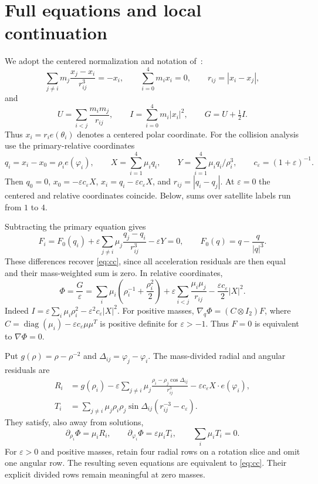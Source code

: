 \documentclass[11pt,a4paper]{article}
\numberwithin{equation}{section}
\theoremstyle{remark}
\newcommand{\eps}{\varepsilon}
\newcommand{\diag}{\operatorname{diag}}
\begin{document}
\section{Full equations and local continuation}\label{sec:variation}

We adopt the centered normalization and notation of~\cite[Section~2]{CCLM}:
\begin{equation}\label{eq:cc}
 \sum_{j\ne i}m_j\frac{x_j-x_i}{r_{ij}^3}=-x_i,\qquad
 \sum_{i=0}^4m_ix_i=0,\qquad r_{ij}=|x_i-x_j|,
\end{equation}
and
\begin{equation}\label{eq:UI}
 U=\sum_{i<j}\frac{m_im_j}{r_{ij}},\qquad
 I=\sum_{i=0}^4m_i|x_i|^2,\qquad G=U+\tfrac12 I.
\end{equation}
Thus $x_i=r_ie(\theta_i)$ denotes a centered polar coordinate. For the collision analysis use the primary-relative coordinates
\[
 q_i=x_i-x_0=\rho_i e(\varphi_i),\qquad
 X=\sum_{i=1}^4\mu_iq_i,\qquad
 Y=\sum_{i=1}^4\mu_iq_i/\rho_i^3,\qquad c_\eps=(1+\eps)^{-1}.
\]
Then $q_0=0$, $x_0=-\eps c_\eps X$, $x_i=q_i-\eps c_\eps X$, and $r_{ij}=|q_i-q_j|$.
At $\eps=0$ the centered and relative coordinates coincide. Below, sums over satellite labels run from $1$ to $4$.

Subtracting the primary equation gives
\begin{equation}\label{eq:G}
 F_i=F_0(q_i)+\eps\sum_{j\ne i}\mu_j\frac{q_j-q_i}{r_{ij}^3}-\eps Y=0,
 \qquad F_0(q)=q-\frac q{|q|^3}.
\end{equation}
These differences recover \eqref{eq:cc}, since all acceleration residuals are then equal and their mass-weighted sum is zero. In relative coordinates,
\begin{equation}\label{eq:action}
 \Phi=\frac G\eps
 =\sum_i\mu_i\left(\rho_i^{-1}+\frac{\rho_i^2}{2}\right)
 +\eps\sum_{i<j}\frac{\mu_i\mu_j}{r_{ij}}
 -\frac{\eps c_\eps}{2}|X|^2.
\end{equation}
Indeed $I=\eps\sum_i\mu_i\rho_i^2-\eps^2c_\eps|X|^2$.
For positive masses, $\nabla_q\Phi=(C\otimes I_2)F$, where
$C=\diag(\mu_i)-\eps c_\eps\mu\mu^T$ is positive definite for $\eps>-1$.
Thus $F=0$ is equivalent to $\nabla\Phi=0$.

Put $g(\rho)=\rho-\rho^{-2}$ and $\Delta_{ij}=\varphi_j-\varphi_i$.
The mass-divided radial and angular residuals are
\begin{align}
 R_i&=g(\rho_i)-\eps\sum_{j\ne i}\mu_j
       \frac{\rho_i-\rho_j\cos\Delta_{ij}}{r_{ij}^3}
       -\eps c_\eps X\cdot e(\varphi_i),\label{eq:R}\\
 T_i&=\sum_{j\ne i}\mu_j\rho_i\rho_j\sin\Delta_{ij}
       (r_{ij}^{-3}-c_\eps).\label{eq:T}
\end{align}
They satisfy, also away from solutions,
\begin{equation}\label{eq:polar-gradient}
 \partial_{\rho_i}\Phi=\mu_iR_i,\qquad
 \partial_{\varphi_i}\Phi=\eps\mu_iT_i,\qquad
 \sum_i\mu_iT_i=0.
\end{equation}
For $\eps>0$ and positive masses, retain four radial rows on a rotation slice and omit one angular row. The resulting seven equations are equivalent to \eqref{eq:cc}. Their explicit divided rows remain meaningful at zero masses.
\end{document}
